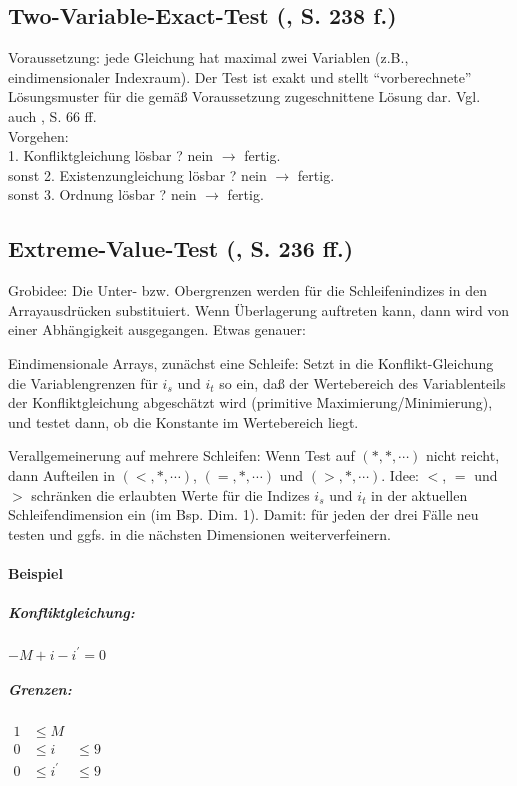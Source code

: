 \subsection{Two-Variable-Exact-Test (\cite{Wol95}, S. 238  f.)}
Voraussetzung: jede Gleichung hat maximal zwei Variablen (z.B.,
eindimensionaler Indexraum). Der Test ist exakt und stellt
``vorberechnete'' Lösungsmuster für die gemäß Voraussetzung
zugeschnittene Lösung dar. Vgl. auch \cite{Ban93}, S. 66 ff.\\
Vorgehen:\\
1. Konfliktgleichung lösbar ? nein \( \rightarrow  \) fertig. \\
sonst 2. Existenzungleichung lösbar ? nein \( \rightarrow \) fertig. \\
sonst 3. Ordnung lösbar ? nein \( \rightarrow \) fertig.


\subsection{Extreme-Value-Test (\cite{Wol95}, S. 236   ff.)}
Grobidee: Die Unter- bzw. Obergrenzen werden für die Schleifenindizes in
den Arrayausdrücken substituiert. Wenn Überlagerung auftreten kann, dann
wird von einer Abhängigkeit ausgegangen. Etwas genauer:

Eindimensionale Arrays, zunächst eine Schleife: Setzt in die
Konflikt-Gleichung die Variablengrenzen für $i_s$ und $i_t$ so ein, daß
der Wertebereich des Variablenteils der Konfliktgleichung abgeschätzt
wird (primitive Maximierung/Minimierung), und testet dann, ob die
Konstante im Wertebereich liegt.

Verallgemeinerung auf mehrere Schleifen: Wenn Test auf $(*,*,\cdots)$
nicht reicht, dann Aufteilen in $(<,*,\cdots)$, $(=,*,\cdots)$ und
$(>,*,\cdots)$. Idee: $<$, $=$ und $>$ schränken die erlaubten Werte für
die Indizes $i_s$ und $i_t$ in der aktuellen Schleifendimension ein (im
Bsp. Dim. 1). Damit: für jeden der drei Fälle neu testen und ggfs. in
die nächsten Dimensionen weiterverfeinern.

\paragraph{Beispiel}
\subparagraph{Konfliktgleichung:} \( -M + i - i^\prime = 0 \)
\subparagraph{Grenzen:}
$\begin{array}{lll}
   1 & \leq M & \\
   0 & \leq i & \leq 9 \\
   0 & \leq i^\prime & \leq 9
\end{array}$

